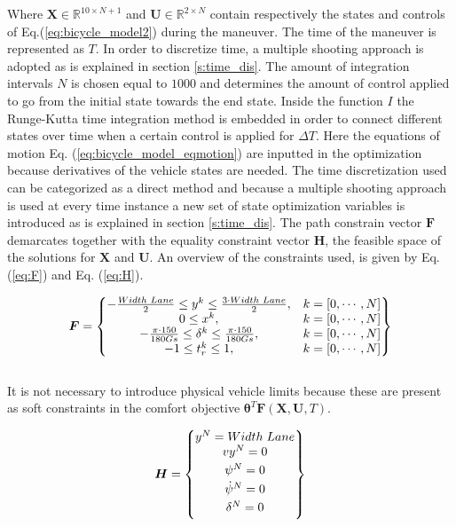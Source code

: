 Where $\bm{X} \in \mathbb{R}^{10\times N+1}$ and $\bm{U}\in \mathbb{R}^{2\times N}$ contain respectively the states and controls of Eq.(\ref{eq:bicycle_model2}) during the maneuver. The time of the maneuver is represented as $T$. In order to discretize time, a multiple shooting approach is adopted as is explained in section \ref{s:time_dis}. The amount of integration intervals $N$ is chosen equal to $1000$ and determines the  amount of control applied to go from the initial state towards the end state. 
Inside the function $I$ the Runge-Kutta time integration method is embedded in order to connect different states over time when a certain control is applied for $\Delta T$. Here the equations of motion Eq. (\ref{eq:bicycle_model_eqmotion}) are inputted in the optimization because derivatives of the vehicle states are needed. The time discretization used can be categorized as a direct method and because a multiple shooting approach is used at every time instance a new set of state optimization variables is introduced as is explained in section \ref{s:time_dis}. The path constrain vector $\bm{F}$ demarcates together with the equality constraint vector $\bm{H}$, the feasible space of the solutions for $\bm{X}$ and $\bm{U}$. An overview of the constraints used, is given by Eq. (\ref{eq:F}) and Eq. (\ref{eq:H}).

\begin{equation}\label{eq:F}
\bm{F} =
\begin{Bmatrix}
-\frac{Width\hspace{1mm}Lane}{2} \leq y^k \leq \frac{3\cdot Width\hspace{1mm}Lane}{2}, & k = [0,\cdots, N] \\
0 \leq x^k, & k = [0,\cdots, N] \\
-\frac{\pi\cdot 150}{180 Gs} \leq \delta^k \leq \frac{\pi\cdot 150}{180 Gs}, & k = [0,\cdots, N] \\
-1 \leq t_r^k \leq 1, & k = [0,\cdots, N]

\end{Bmatrix}
\end{equation}\\

It is not necessary to introduce physical vehicle limits because these are present as soft constraints in the comfort objective $\bm{\theta}^T\bm{F}(\bm{X},\bm{U}, T)$.

\begin{equation}\label{eq:H}
\bm{H} =
\begin{Bmatrix}
y^N = Width\hspace{1mm}Lane \\ \vspace{1mm}
vy^N = 0 \\\vspace{1mm}
\psi^N = 0 \\\vspace{1mm}
\dot{\psi}^N = 0 \\\vspace{1mm}
\delta^N = 0 

\end{Bmatrix}
\end{equation}\vspace{5mm}

